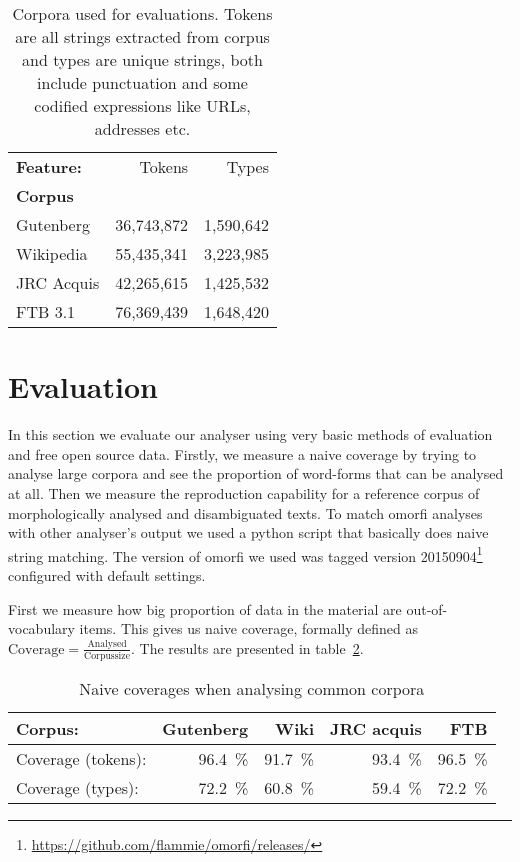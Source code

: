 \documentclass[a4paper,12pt]{article}
\begin{document}
\begin{table}
    \begin{scriptsize}
  \centering
    \begin{tabular}{|l|r|r|}
        \hline
        \bf Feature: & Tokens     & Types     \\
        \bf Corpus   &            &           \\
        \hline
        Gutenberg    & 36,743,872 & 1,590,642 \\
        Wikipedia    & 55,435,341 & 3,223,985 \\
        JRC Acquis   & 42,265,615 & 1,425,532 \\
        FTB 3.1      & 76,369,439 & 1,648,420 \\
        \hline
    \end{tabular}
  \caption{Corpora used for evaluations. Tokens are all strings extracted from
      corpus and types are unique strings, both include punctuation and some
      codified expressions like URLs, addresses etc.
  \label{table:corpora}}
  \end{scriptsize}
\end{table}

\section{Evaluation}
\label{sec:evaluation}

In this section we evaluate our analyser using very basic methods of evaluation
and free open source data. Firstly, we measure a naive coverage by trying to
analyse large corpora and see the proportion of word-forms that can be analysed
at all. Then we measure the reproduction capability for a reference corpus of
morphologically analysed and disambiguated texts. To match omorfi analyses with
other analyser's output we used a python script that basically does naive
string matching. The version of omorfi we used was tagged version
20150904\footnote{\url{https://github.com/flammie/omorfi/releases/}}
configured with default settings.


First we measure how big proportion of data in the material are
out-of-vocabulary items. This gives us naive coverage, formally defined as
$\mathrm{Coverage} = \frac{\mathrm{Analysed}}{\mathrm{Corpus size}}$.
The results are presented in table~\ref{table:coverage}. 

\begin{table}
    \begin{scriptsize}
    \centering
    \begin{tabular}{|l|r|r|r|r|}
        \hline
        Corpus:            & \bf Gutenberg & \bf Wiki & \bf JRC acquis & \bf FTB \\
        \hline
        Coverage (tokens): & 96.4~\%       & 91.7~\%  & 93.4~\%        & 96.5~\% \\
        Coverage (types):  & 72.2~\%       & 60.8~\%  & 59.4~\%        & 72.2~\% \\
        \hline
    \end{tabular}
    \caption{Naive coverages when analysing common corpora
    \label{table:coverage}}
  \end{scriptsize}
\end{table}
\end{document}
